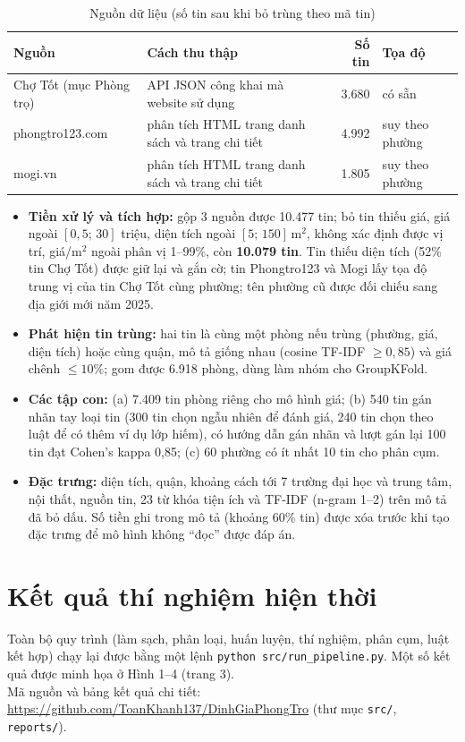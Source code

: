 \documentclass[11pt,a4paper]{article}
\begin{document}
\begin{table}[h]
\centering\small
\caption{Nguồn dữ liệu (số tin sau khi bỏ trùng theo mã tin)}
\begin{tabular}{@{}llrl@{}}
\toprule
Nguồn & Cách thu thập & Số tin & Tọa độ \\
\midrule
Chợ Tốt (mục Phòng trọ) & API JSON công khai mà website sử dụng & 3.680 & có sẵn \\
phongtro123.com & phân tích HTML trang danh sách và trang chi tiết & 4.992 & suy theo phường \\
mogi.vn & phân tích HTML trang danh sách và trang chi tiết & 1.805 & suy theo phường \\
\bottomrule
\end{tabular}
\end{table}
\vspace{-8pt}
\begin{itemize}
  \item \textbf{Tiền xử lý và tích hợp:} gộp 3 nguồn được 10.477 tin; bỏ tin thiếu giá, giá ngoài $[0{,}5;\,30]$ triệu,
        diện tích ngoài $[5;\,150]$\,m$^2$, không xác định được vị trí, giá/m$^2$ ngoài phân vị 1--99\%, còn
        \textbf{10.079 tin}. Tin thiếu diện tích (52\% tin Chợ Tốt) được giữ lại và gắn cờ; tin Phongtro123 và Mogi
        lấy tọa độ trung vị của tin Chợ Tốt cùng phường; tên phường cũ được đối chiếu sang địa giới mới năm 2025.
  \item \textbf{Phát hiện tin trùng:} hai tin là cùng một phòng nếu trùng (phường, giá, diện tích) hoặc cùng quận, mô tả giống
        nhau (cosine TF-IDF $\ge 0{,}85$) và giá chênh $\le 10\%$; gom được 6.918 phòng, dùng làm nhóm cho GroupKFold.
  \item \textbf{Các tập con:} (a) 7.409 tin phòng riêng cho mô hình giá; (b) 540 tin gán nhãn tay loại tin
        (300 tin chọn ngẫu nhiên để đánh giá, 240 tin chọn theo luật để có thêm ví dụ lớp hiếm), có hướng dẫn gán nhãn
        và lượt gán lại 100 tin đạt Cohen's kappa 0,85; (c) 60 phường có ít nhất 10 tin cho phân cụm.
  \item \textbf{Đặc trưng:} diện tích, quận, khoảng cách tới 7 trường đại học và trung tâm, nội thất, nguồn tin,
        23 từ khóa tiện ích và TF-IDF (n-gram 1--2) trên mô tả đã bỏ dấu. Số tiền ghi trong mô tả (khoảng 60\% tin)
        được xóa trước khi tạo đặc trưng để mô hình không ``đọc'' được đáp án.
\end{itemize}

\section{Kết quả thí nghiệm hiện thời}
Toàn bộ quy trình (làm sạch, phân loại, huấn luyện, thí nghiệm, phân cụm, luật kết hợp) chạy lại được bằng một lệnh
\texttt{python src/run\_pipeline.py}. Một số kết quả được minh họa ở Hình 1--4 (trang 3).\\
Mã nguồn và bảng kết quả chi tiết: \url{https://github.com/ToanKhanh137/DinhGiaPhongTro} (thư mục \texttt{src/}, \texttt{reports/}).
\end{document}
